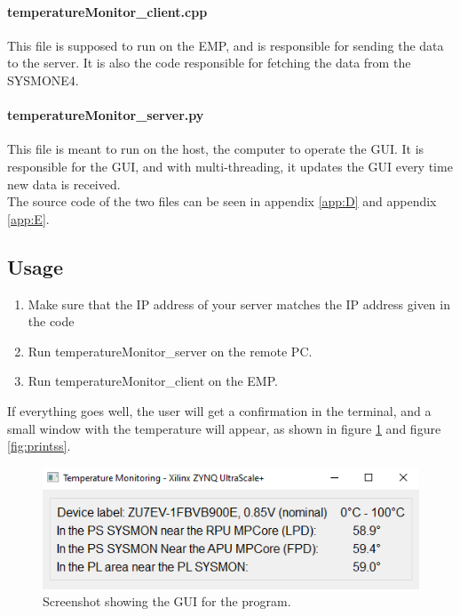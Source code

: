 \paragraph{temperatureMonitor\_client.cpp} \hspace{-0.3 cm} This file is supposed to run on the EMP, and is responsible for sending the data to the server. It is also the code responsible for fetching the data from the SYSMONE4. 

\paragraph{temperatureMonitor\_server.py} \hspace{-0.3 cm}
This file is meant to run on the host, the computer to operate the GUI. It is responsible for the GUI, and with multi-threading, it updates the GUI every time new data is received. \\

\noindent The source code of the two files can be seen in appendix \ref{app:D} and appendix \ref{app:E}.
 
\subsection*{Usage}

\begin{enumerate}
    \item Make sure that the IP address of your server matches the IP address given in the code
    \vspace{-0.2 cm} 
    \item Run temperatureMonitor\_server on the remote PC.
    \vspace{-0.2 cm} 
    \item Run temperatureMonitor\_client on the EMP.
\end{enumerate}

\noindent If everything goes well, the user will get a confirmation in the terminal, and a small window with the temperature will appear, as shown in figure \ref{fig:guis} and figure \ref{fig:printss}.\\

\begin{figure}[H]
    \centering
    \includegraphics[width=.8\textwidth]{Graphics/GUI.PNG}
    \caption{Screenshot showing the GUI for the program.}
    \label{fig:guis}
\end{figure}

